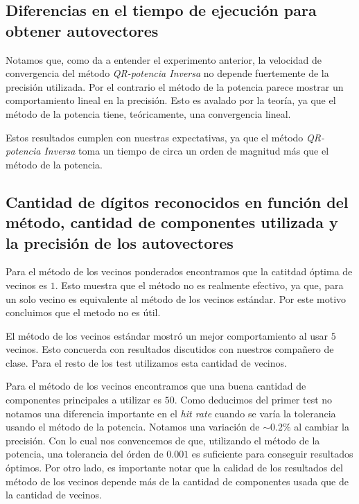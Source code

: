 	\subsection{Diferencias en el tiempo de ejecuci\'on para obtener autovectores}

		Notamos que, como da a entender el experimento anterior, la velocidad de convergencia
		del m\'etodo \textit{QR-potencia Inversa} no depende fuertemente de la precisi\'on
		utilizada. Por el contrario el m\'etodo de la potencia parece mostrar un comportamiento
		lineal en la precisi\'on. Esto es avalado por la teor\'ia, ya que el m\'etodo de la
		potencia tiene, te\'oricamente, una convergencia lineal.

		Estos resultados cumplen con nuestras expectativas, ya que el m\'etodo \textit{QR-potencia
		Inversa} toma un tiempo de circa un orden de magnitud m\'as que el m\'etodo de la potencia.

	\subsection{Cantidad de d\'igitos reconocidos en funci\'on del m\'etodo,
	cantidad de componentes utilizada y la precisi\'on de los autovectores}
		
		Para el m\'etodo de los vecinos ponderados encontramos que la catitdad \'optima de
		vecinos es $1$. Esto muestra que el m\'etodo no es realmente efectivo, ya que,
		para un solo vecino es equivalente al m\'etodo de los vecinos est\'andar.
		Por este motivo concluimos que el metodo no es \'util.

		El m\'etodo de los vecinos est\'andar mostr\'o un mejor comportamiento al
		usar $5$ vecinos. Esto concuerda con resultados discutidos con nuestros
		compa\~nero de clase. Para el resto de los test utilizamos esta cantidad
		de vecinos.

		Para el m\'etodo de los vecinos encontramos que una buena cantidad de componentes
		principales a utilizar es $50$.
		Como deducimos del primer test no notamos una diferencia importante en el \textit{hit rate}
		cuando se var\'ia la tolerancia usando el m\'etodo de la potencia. Notamos una variaci\'on
		de $\sim 0.2\%$ al cambiar la precisi\'on. Con lo cual nos convencemos de que, utilizando
		el m\'etodo de la potencia, una tolerancia del \'orden de $0.001$ es suficiente para
		conseguir resultados \'optimos.
		Por otro lado, es importante notar que la calidad de los resultados del m\'etodo de los
		vecinos depende m\'as de la cantidad de componentes usada que de la cantidad de vecinos.

